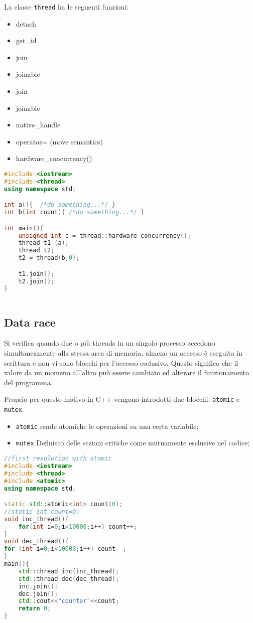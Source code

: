 La classe \verb|thread| ha le seguenti funzioni:
\begin{itemize}
    \item detach
    \item get\_id
    \item join
    \item joinable
    \item join
    \item joinable
    \item native\_handle
    \item operator= (move semantics)
    \item hardware\_concurrency()
\end{itemize}


\begin{lstlisting}[language=c++]
#include <iostream>
#include <thread> 
using namespace std;

int a(){  /*do something...*/ }
int b(int count){ /*do something...*/ }

int main(){
    unsigned int c = thread::hardware_concurrency();
    thread t1 (a);
    thread t2;
    t2 = thread(b,0);

    t1.join();
    t2.join();
}
   
\end{lstlisting}

\subsection{Data race}
Si verifica quando due o più threads in un singolo processo accedono simultaneamente alla stessa area di memoria, almeno un accesso è eseguito in scrittura e non vi sono blocchi per l'accesso esclusivo. Questo significa che il valore da un momeno all'altro può essere cambiato ed alterare il funzionamento del programma.

Proprio per questo motivo in C++ vengono introdotti due blocchi: \verb|atomic| e \verb|mutex|.

\begin{itemize}
    \item \verb|atomic| rende atomiche le operazioni su una certa variabile;
    \item \verb|mutex| Definisco delle sezioni critiche come mutuamente esclusive nel codice;
\end{itemize}

\begin{lstlisting}[language=c++]
//first resolution with atomic 
#include <iostream>   
#include <thread>
#include <atomic>
using namespace std;

static std::atomic<int> count(0);
//static int count=0;
void inc_thread(){
    for(int i=0;i<10000;i++) count++;
}
void dec_thread(){
for (int i=0;i<10000;i++) count--;
}
main(){
    std::thread inc(inc_thread);
    std::thread dec(dec_thread);
    inc.join();
    dec.join();
    std::cout<<"counter"<<count;
    return 0;
} 
\end{lstlisting}


